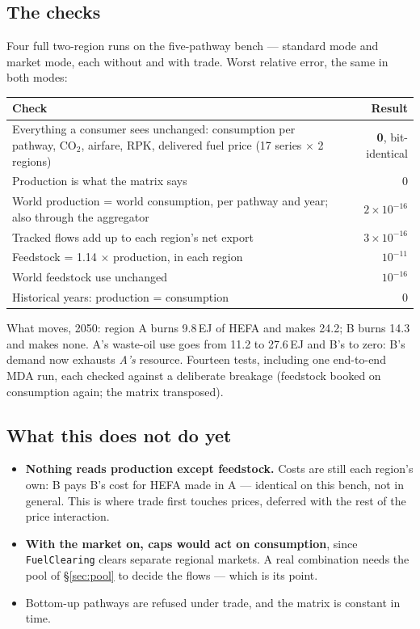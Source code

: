 \documentclass[11pt,a4paper]{article}
\newcommand{\var}[1]{\texttt{\small #1}}
\begin{document}
\subsection{The checks}

Four full two-region runs on the five-pathway bench --- standard mode and market mode, each
without and with trade. Worst relative error, the same in both modes:

\begin{center}\small
\begin{tabular}{@{}p{11.5cm}r@{}}
\toprule
\textbf{Check} & \textbf{Result} \\
\midrule
Everything a consumer sees unchanged: consumption per pathway, CO$_2$, airfare, RPK, delivered fuel price (17 series $\times$ 2 regions) & \textbf{0}, bit-identical \\
Production is what the matrix says & 0 \\
World production = world consumption, per pathway and year; also through the aggregator & $2\times10^{-16}$ \\
Tracked flows add up to each region's net export & $3\times10^{-16}$ \\
Feedstock = 1.14 $\times$ production, in each region & $10^{-11}$ \\
World feedstock use unchanged & $10^{-16}$ \\
Historical years: production = consumption & 0 \\
\bottomrule
\end{tabular}
\end{center}

\noindent What moves, 2050: region A burns 9.8\,EJ of HEFA and makes 24.2; B burns 14.3 and makes
none. A's waste-oil use goes from 11.2 to 27.6\,EJ and B's to zero: B's demand now exhausts
\emph{A's} resource. Fourteen tests, including one end-to-end MDA run, each checked against a
deliberate breakage (feedstock booked on consumption again; the matrix transposed).

\subsection{What this does not do yet}

\begin{itemize}[leftmargin=*,nosep]
  \item \textbf{Nothing reads production except feedstock.} Costs are still each region's own:
    B pays B's cost for HEFA made in A --- identical on this bench, not in general. This is where
    trade first touches prices, deferred with the rest of the price interaction.
  \item \textbf{With the market on, caps would act on consumption}, since \var{FuelClearing} clears
    separate regional markets. A real combination needs the pool of \S\ref{sec:pool} to decide
    the flows --- which is its point.
  \item Bottom-up pathways are refused under trade, and the matrix is constant in time.
\end{itemize}
\end{document}
